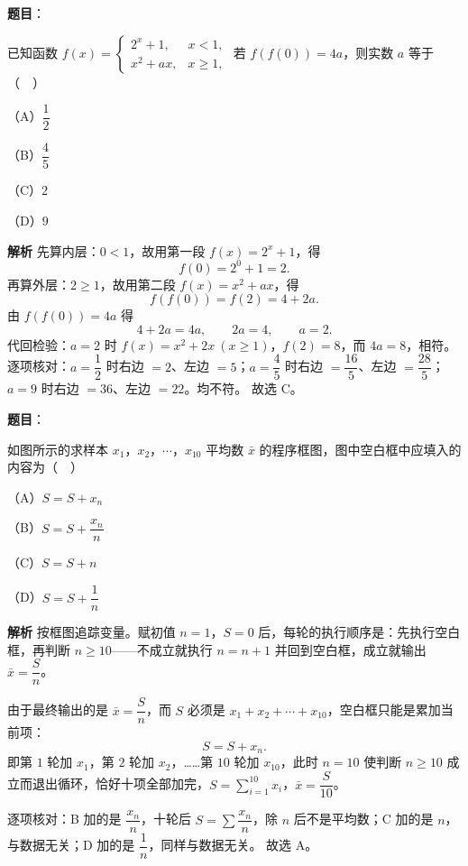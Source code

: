 \begin{answer}

\textbf{题目}：

已知函数 $f(x)=\begin{cases}2^x+1,&x<1,\\[2pt]x^2+ax,&x\geqslant 1,\end{cases}$ 若 $f(f(0))=4a$，则实数 $a$ 等于（　）

（A）$\dfrac12$

（B）$\dfrac45$

（C）$2$

（D）$9$

\textbf{解析}
先算内层：$0<1$，故用第一段 $f(x)=2^x+1$，得
\nopagebreak[4]
\[f(0)=2^0+1=2.\]
再算外层：$2\geqslant 1$，故用第二段 $f(x)=x^2+ax$，得
\nopagebreak[4]
\[f(f(0))=f(2)=4+2a.\]
由 $f(f(0))=4a$ 得
\nopagebreak[4]
\[4+2a=4a,\qquad 2a=4,\qquad a=2.\]
代回检验：$a=2$ 时 $f(x)=x^2+2x\ (x\geqslant 1)$，$f(2)=8$，而 $4a=8$，相符。
逐项核对：$a=\dfrac12$ 时右边 $=2$、左边 $=5$；$a=\dfrac45$ 时右边 $=\dfrac{16}{5}$、左边 $=\dfrac{28}{5}$；$a=9$ 时右边 $=36$、左边 $=22$。均不符。
故选 C。


\end{answer}
\begin{answer}

\textbf{题目}：

如图所示的求样本 $x_1$，$x_2$，$\cdots$，$x_{10}$ 平均数 $\bar x$ 的程序框图，图中空白框中应填入的内容为（　）

（A）$S=S+x_n$

（B）$S=S+\dfrac{x_n}{n}$

（C）$S=S+n$

（D）$S=S+\dfrac1n$
\nopagebreak[4]
\begin{center}\end{center}
\nopagebreak[4]
\textbf{解析}
按框图追踪变量。赋初值 $n=1$，$S=0$ 后，每轮的执行顺序是：先执行空白框，再判断 $n\geqslant 10$——不成立就执行 $n=n+1$ 并回到空白框，成立就输出 $\bar x=\dfrac Sn$。

由于最终输出的是 $\bar x=\dfrac Sn$，而 $S$ 必须是 $x_1+x_2+\cdots+x_{10}$，空白框只能是累加当前项：
\nopagebreak[4]
\[S=S+x_n.\]
即第 $1$ 轮加 $x_1$，第 $2$ 轮加 $x_2$，……第 $10$ 轮加 $x_{10}$，此时 $n=10$ 使判断 $n\geqslant 10$ 成立而退出循环，恰好十项全部加完，$S=\sum_{i=1}^{10}x_i$，$\bar x=\dfrac{S}{10}$。

逐项核对：B 加的是 $\dfrac{x_n}{n}$，十轮后 $S=\sum\dfrac{x_n}{n}$，除 $n$ 后不是平均数；C 加的是 $n$，与数据无关；D 加的是 $\dfrac1n$，同样与数据无关。
故选 A。


\end{answer}
